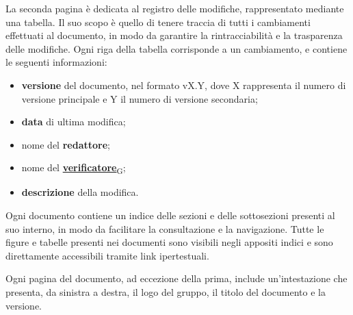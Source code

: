 La seconda pagina è dedicata al registro delle modifiche, rappresentato mediante una tabella. Il suo scopo è quello di tenere traccia di tutti i cambiamenti effettuati al documento,
in modo da garantire la rintracciabilità e la trasparenza delle modifiche. Ogni riga della tabella corrisponde a un cambiamento, e contiene le seguenti informazioni:
\begin{itemize}
	\item \textbf{versione} del documento, nel formato vX.Y, dove X rappresenta il numero di versione principale e Y il numero di versione secondaria;
	\item \textbf{data} di ultima modifica;
	\item nome del \textbf{redattore};
	\item nome del \href{https://7last.github.io/docs/pb/documentazione-interna/glossario\#verificatore}{\textbf{verificatore}\textsubscript{G}};
	\item \textbf{descrizione} della modifica.
\end{itemize}

Ogni documento contiene un indice delle sezioni e delle sottosezioni presenti al suo interno, in modo da facilitare la consultazione e la navigazione.
Tutte le figure e tabelle presenti nei documenti sono visibili negli appositi indici e sono direttamente accessibili tramite link ipertestuali.

Ogni pagina del documento, ad eccezione della prima, include un'intestazione che presenta, da sinistra a destra, il logo del gruppo, il titolo del documento e la versione.


